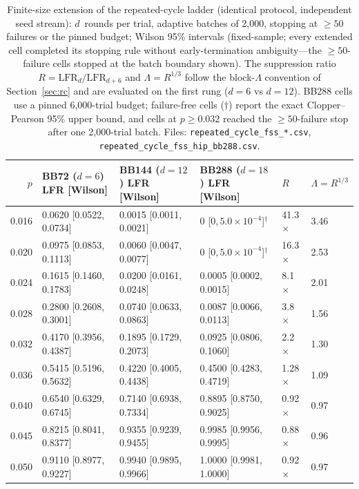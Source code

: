 \documentclass[pdflatex,sn-mathphys-num]{sn-jnl}
\theoremstyle{thmstyleone}
\theoremstyle{thmstyletwo}
\theoremstyle{thmstylethree}
\begin{document}
\begin{table}[htbp]\centering\small
\caption{Finite-size extension of the repeated-cycle ladder (identical protocol, independent seed stream): $d$~rounds per trial, adaptive batches of 2{,}000, stopping at $\ge50$ failures or the pinned budget; Wilson 95\% intervals (fixed-sample; every extended cell completed its stopping rule without early-termination ambiguity---the $\ge50$-failure cells stopped at the batch boundary shown). The suppression ratio $R=\mathrm{LFR}_{d}/\mathrm{LFR}_{d+6}$ and $\Lambda=R^{1/3}$ follow the block-$\Lambda$ convention of Section~\ref{sec:rc} and are evaluated on the first rung ($d{=}6$ vs $d{=}12$). BB288 cells use a pinned 6{,}000-trial budget; failure-free cells ($\dagger$) report the exact Clopper--Pearson 95\% upper bound, and cells at $p\ge0.032$ reached the $\ge50$-failure stop after one 2{,}000-trial batch. Files: \texttt{repeated\_cycle\_fss\_*.csv}, \texttt{repeated\_cycle\_fss\_hip\_bb288.csv}.}
\label{tab:fss}
\setlength{\tabcolsep}{2.5pt}
\begin{tabular}{@{}rlllll@{}}
\toprule
$p$ & BB72 ($d{=}6$) LFR [Wilson] & BB144 ($d{=}12$) LFR [Wilson] & BB288 ($d{=}18$) LFR [Wilson] & $R$ & $\Lambda=R^{1/3}$ \\\midrule
0.016 & 0.0620 [0.0522,\,0.0734] & 0.0015 [0.0011,\,0.0021] & $0$ [$0$,\,$5.0{\times}10^{-4}$]$^{\dagger}$ & 41.3$\times$ & 3.46 \\
0.020 & 0.0975 [0.0853,\,0.1113] & 0.0060 [0.0047,\,0.0077] & $0$ [$0$,\,$5.0{\times}10^{-4}$]$^{\dagger}$ & 16.3$\times$ & 2.53 \\
0.024 & 0.1615 [0.1460,\,0.1783] & 0.0200 [0.0161,\,0.0248] & 0.0005 [0.0002,\,0.0015] & \phantom{0}8.1$\times$ & 2.01 \\
0.028 & 0.2800 [0.2608,\,0.3001] & 0.0740 [0.0633,\,0.0863] & 0.0087 [0.0066,\,0.0113] & \phantom{0}3.8$\times$ & 1.56 \\
0.032 & 0.4170 [0.3956,\,0.4387] & 0.1895 [0.1729,\,0.2073] & 0.0925 [0.0806,\,0.1060] & \phantom{0}2.2$\times$ & 1.30 \\
0.036 & 0.5415 [0.5196,\,0.5632] & 0.4220 [0.4005,\,0.4438] & 0.4500 [0.4283,\,0.4719] & \phantom{0}1.28$\times$ & 1.09 \\
0.040 & 0.6540 [0.6329,\,0.6745] & 0.7140 [0.6938,\,0.7334] & 0.8895 [0.8750,\,0.9025] & \phantom{0}0.92$\times$ & 0.97 \\
0.045 & 0.8215 [0.8041,\,0.8377] & 0.9355 [0.9239,\,0.9455] & 0.9985 [0.9956,\,0.9995] & \phantom{0}0.88$\times$ & 0.96 \\
0.050 & 0.9110 [0.8977,\,0.9227] & 0.9940 [0.9895,\,0.9966] & 1.0000 [0.9981,\,1.0000] & \phantom{0}0.92$\times$ & 0.97 \\
\bottomrule
\end{tabular}
\end{table}
\end{document}
